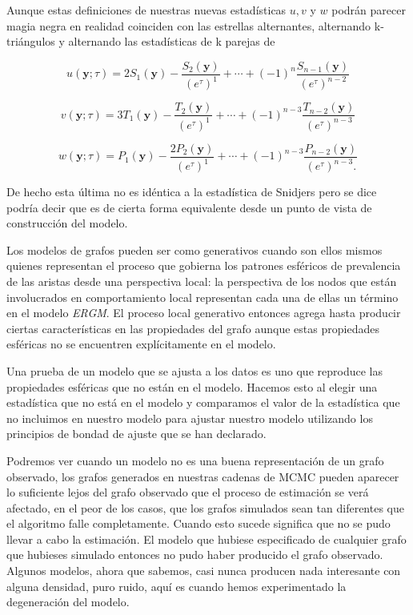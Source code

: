 Aunque estas definiciones de nuestras nuevas estadísticas $u,v$ y $w$ podrán parecer magia negra en realidad coinciden con las estrellas alternantes, alternando k-triángulos y alternando las estadísticas de k parejas de \cite{snijders_markov_2002} 


\begin{equation*}
    u(\mathbf{y} ; \tau)=2 S_{1}(\mathbf{y})-\frac{S_{2}(\mathbf{y})}{\left(e^{\tau}\right)^{1}}+\cdots+(-1)^{n} \frac{S_{n-1}(\mathbf{y})}{\left(e^{\tau}\right)^{n-2}}

\end{equation*}

\begin{equation*}
    v(\mathbf{y} ; \tau)=3 T_{1}(\mathbf{y})-\frac{T_{2}(\mathbf{y})}{\left(e^{\tau}\right)^{1}}+\cdots+(-1)^{n-3} \frac{T_{n-2}(\mathbf{y})}{\left(e^{\tau}\right)^{n-3}}

\end{equation*}


\begin{equation*}
    w(\mathbf{y} ; \tau)=P_{1}(\mathbf{y})-\frac{2 P_{2}(\mathbf{y})}{\left(e^{\tau}\right)^{1}}+\cdots+(-1)^{n-3} \frac{P_{n-2}(\mathbf{y})}{\left(e^{\tau}\right)^{n-3}.}
\end{equation*}


De hecho esta última no es idéntica a la estadística de Snidjers \cite{GoodOfFitSocialNetwork} pero se dice podría decir que es de cierta forma equivalente desde un punto de vista de construcción del modelo. 

Los modelos de grafos pueden ser como generativos cuando son ellos mismos quienes representan el proceso que gobierna los patrones esféricos de prevalencia de las aristas desde una perspectiva local: la perspectiva de los nodos que están involucrados en comportamiento local representan cada una de ellas un término en el modelo \textit{ERGM}. El proceso local generativo entonces agrega hasta producir ciertas características en las propiedades del grafo aunque estas propiedades esféricas no se encuentren explícitamente en el modelo.

Una prueba de un modelo que se ajusta a los datos es uno que reproduce las propiedades esféricas que no están en el modelo. Hacemos esto al elegir una estadística que no está en el modelo y comparamos el valor de la estadística que no incluimos en nuestro modelo para ajustar nuestro modelo utilizando los principios de bondad de ajuste que se han declarado.

Podremos ver cuando un modelo no es una buena representación de un grafo observado, los grafos generados en nuestras cadenas de MCMC pueden aparecer lo suficiente lejos del grafo observado que el proceso de estimación se verá afectado, en el peor de los casos, que los grafos simulados sean tan diferentes que el algoritmo falle completamente. Cuando esto sucede significa que no se pudo llevar a cabo la estimación. El modelo que hubiese especificado de cualquier grafo que hubieses simulado entonces no pudo haber producido el grafo observado. Algunos modelos, ahora que sabemos, casi nunca producen nada interesante con alguna densidad, puro ruido, aquí es cuando hemos experimentado la degeneración del modelo.

